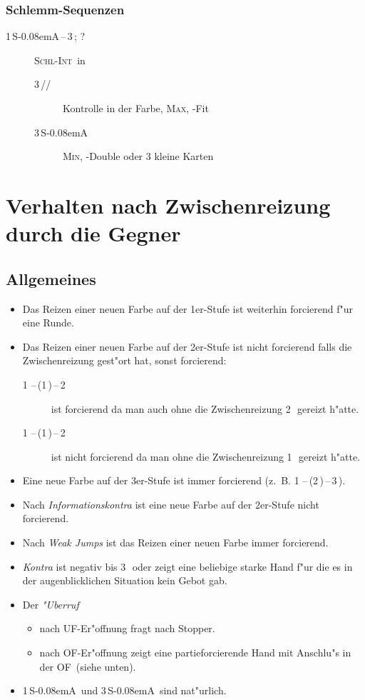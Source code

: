 \documentclass[11pt,german,twocolumn]{scrartcl}
\def\pik{\nobreak\,\Sp}
\def\coe{\nobreak\,\He}
\def\kar{\nobreak\,\Di}
\def\tre{\nobreak\,\Cl}
\def\pi{\Sp}
\def\co{\He}
\def\tr{\Cl}
\def\ufa{\nobreak\textsf{UF}}
\def\ofa{\nobreak\textsf{OF}}
\def\sa{\nobreak\textsf{S\kern-0.08emA}}
\def\SA{\nobreak\,\sa}
\def\sep{\nobreak\,--\,}
\newcommand{\conv}[1]{\emph{#1}}
\def\maxi{\textsc{Max}}
\def\mini{\textsc{Min}}
\def\bdsc{\begin{description}}
\def\edsc{\end{description}}
\def\slamint{\textsc{Schl-Int}}
\begin{document}
\subsubsection{Schlemm-Sequenzen}

\bdsc
  \item[1\SA\sep3\tre; ?] \slamint\ in \tr
  \bdsc
    \item[3\kar/\co/\pi] Kontrolle in der Farbe, \maxi, \tr-Fit
    \item[3\SA] \mini, \tr-Double oder 3 kleine Karten
  \edsc
\edsc

\section{Verhalten nach Zwischenreizung durch die Gegner}

\subsection{Allgemeines}
\begin{itemize}
\item Das Reizen einer neuen Farbe auf der 1er-Stufe ist weiterhin
forcierend f"ur eine Runde.
%
\item Das Reizen einer neuen Farbe auf der 2er-Stufe ist nicht forcierend
falls die Zwischenreizung gest"ort hat, sonst forcierend:
\begin{description}
\item[1\coe\sep(1\pik)\sep2\kar] ist forcierend da man auch
ohne die Zwischenreizung 2\kar\ gereizt h"atte.
\item[1\tre\sep(1\pik)\sep2\coe] ist nicht forcierend da man ohne die
  Zwischenreizung 1\coe\ gereizt h"atte.
\end{description}
%
\item Eine neue Farbe auf der 3er-Stufe ist immer forcierend
  (z.~B. 1\pik\sep(2\kar)\sep3\tre).
\item Nach \conv{Informationskontra} ist eine neue Farbe auf der 2er-Stufe
  nicht forcierend.
\item Nach \conv{Weak Jumps} ist das Reizen einer neuen Farbe immer
  forcierend.
\item \conv{Kontra} ist negativ bis 3\coe\ oder zeigt eine beliebige
  starke Hand f"ur die es in der augenblicklichen Situation kein Gebot
  gab.
\item Der \conv{"Uberruf}
  \begin{itemize}
    \item nach \ufa-Er"offnung fragt nach Stopper.
    \item nach \ofa-Er"offnung zeigt eine partieforcierende Hand mit
      Anschlu"s in der \ofa\ (siehe unten).
    \end{itemize}
\item 1\SA\ und 3\SA\ sind nat"urlich.
\end{itemize}
\end{document}
